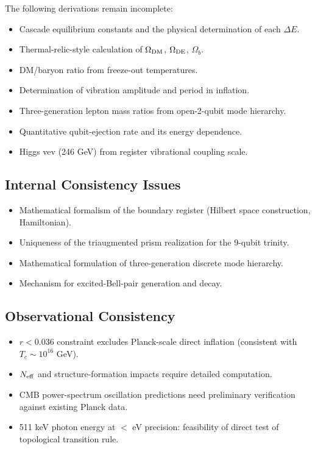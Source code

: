 \documentclass[11pt,a4paper]{article}
\begin{document}
The following derivations remain incomplete:
\begin{itemize}[leftmargin=*]
\item Cascade equilibrium constants and the physical determination of each $\Delta E$.
\item Thermal-relic-style calculation of $\Omega_{\rm DM}$, $\Omega_{\rm DE}$, $\Omega_b$.
\item DM/baryon ratio from freeze-out temperatures.
\item Determination of vibration amplitude and period in inflation.
\item Three-generation lepton mass ratios from open-2-qubit mode hierarchy.
\item Quantitative qubit-ejection rate and its energy dependence.
\item Higgs vev (246 GeV) from register vibrational coupling scale.
\end{itemize}

\subsection{Internal Consistency Issues}

\begin{itemize}[leftmargin=*]
\item Mathematical formalism of the boundary register (Hilbert space construction, Hamiltonian).
\item Uniqueness of the triaugmented prism realization for the 9-qubit trinity.
\item Mathematical formulation of three-generation discrete mode hierarchy.
\item Mechanism for excited-Bell-pair generation and decay.
\end{itemize}

\subsection{Observational Consistency}

\begin{itemize}[leftmargin=*]
\item $r < 0.036$ constraint excludes Planck-scale direct inflation (consistent with $T_c \sim 10^{16}$ GeV).
\item $N_{\rm eff}$ and structure-formation impacts require detailed computation.
\item CMB power-spectrum oscillation predictions need preliminary verification against existing Planck data.
\item 511 keV photon energy at $<$ eV precision: feasibility of direct test of topological transition rule.
\end{itemize}
\end{document}
